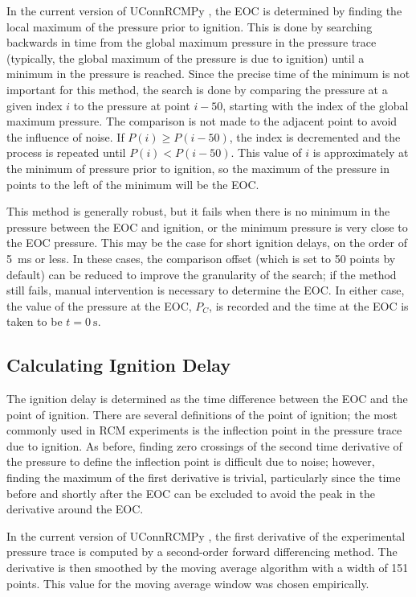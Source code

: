 \documentclass[12pt]{../ussci}
\begin{document}
In the current version of UConnRCMPy \autocite{uconnrcmpy}, the EOC is
determined by finding the local maximum of the pressure prior to
ignition. This is done by searching backwards in time from the global
maximum pressure in the pressure trace (typically, the global maximum of
the pressure is due to ignition) until a minimum in the pressure is
reached. Since the precise time of the minimum is not important for this
method, the search is done by comparing the pressure at a given index
\(i\) to the pressure at point \(i-50\), starting with the index of the
global maximum pressure. The comparison is not made to the adjacent
point to avoid the influence of noise. If \(P(i) \geq P(i-50)\), the
index is decremented and the process is repeated until
\(P(i) < P(i-50)\). This value of \(i\) is approximately at the minimum
of pressure prior to ignition, so the maximum of the pressure in points
to the left of the minimum will be the EOC.

This method is generally robust, but it fails when there is no minimum
in the pressure between the EOC and ignition, or the minimum pressure is
very close to the EOC pressure. This may be the case for short ignition
delays, on the order of \SI{5}{\ms} or less. In these cases, the comparison
offset (which is set to 50 points by default) can be reduced to improve
the granularity of the search; if the method still fails, manual
intervention is necessary to determine the EOC. In either case, the
value of the pressure at the EOC, \(P_C\), is recorded and the time at
the EOC is taken to be \(t=\SI{0}{\s}\).

\subsection{Calculating Ignition
Delay}\label{calculating-ignition-delay}

The ignition delay is determined as the time difference between the EOC
and the point of ignition. There are several definitions of the point of
ignition; the most commonly used in RCM experiments is the inflection
point in the pressure trace due to ignition. As before, finding zero
crossings of the second time derivative of the pressure to define the
inflection point is difficult due to noise; however, finding the maximum
of the first derivative is trivial, particularly since the time before
and shortly after the EOC can be excluded to avoid the peak in the
derivative around the EOC.

In the current version of UConnRCMPy \autocite{uconnrcmpy}, the first
derivative of the experimental pressure trace is computed by a
second-order forward differencing method. The derivative is then
smoothed by the moving average algorithm with a width of 151 points.
This value for the moving average window was chosen empirically.
\end{document}
